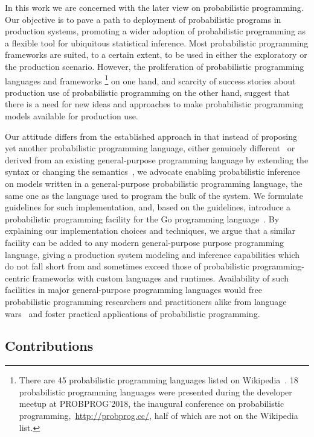 \documentclass[sigplan,10pt,screen]{acmart}
\begin{document}
\begin{sloppypar}
  In this work we are concerned with the later view on
  probabilistic programming. Our objective is to pave a path
  to deployment of probabilistic programs in production
  systems, promoting a wider adoption of probabilistic
  programming as a flexible tool for ubiquitous statistical
  inference. Most probabilistic programming frameworks are
  suited, to a certain extent, to be used in either the
  exploratory or the production scenario. However, the
  proliferation of probabilistic programming languages and
  frameworks \footnote{There are 45 probabilistic programming
  languages listed on
  Wikipedia~\cite{wiki:Probabilistic_programming_language}. 18
  probabilistic programming languages were presented during
  the developer meetup at PROBPROG'2018, the inaugural
  conference on probabilistic
  programming,~\url{http://probprog.cc/}, half of which are
  not on the Wikipedia list.} on one hand, and scarcity of success
  stories about production use of probabilistic programming on
  the other hand, suggest that there is a need for new ideas
  and approaches to make probabilistic programming models
  available for production use.

  Our attitude differs from the established approach in that
  instead of proposing yet another probabilistic programming
  language, either genuinely different~\cite{MMR+07,Stan17} or
  derived from an existing general-purpose programming
  language by extending the syntax or changing the
  semantics~\cite{GMR+08,TMY+16,GXG18}, we advocate enabling
  probabilistic inference on models written in a
  general-purpose probabilistic programming language, the same
  one as the language used to program the bulk of the system.
  We formulate guidelines for such implementation, and, based
  on the guidelines, introduce a probabilistic programming
  facility for the Go programming language~\cite{Golang}. By
  explaining our implementation choices and techniques,
  we argue that a similar facility can be added to any modern
  general-purpose purpose programming language, giving a
  production system modeling and inference capabilities which
  do not fall short from and sometimes exceed those of
  probabilistic programming-centric frameworks with custom
  languages and runtimes. Availability of such facilities
  in major general-purpose programming languages would free
  probabilistic programming researchers and practitioners
  alike from language wars~\cite{SH14} and foster practical
  applications of probabilistic programming.

  \subsection*{Contributions}


\end{sloppypar}
\end{document}
